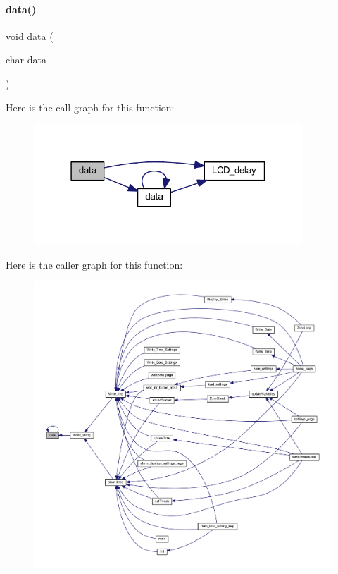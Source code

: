 \paragraph{data()}
{\footnotesize\ttfamily void data (\begin{DoxyParamCaption}\item[{char}]{data }\end{DoxyParamCaption})}

Here is the call graph for this function\+:
\nopagebreak
\begin{figure}[H]
\begin{center}
\leavevmode
\includegraphics[width=286pt]{a00035_a54955197a7b52d9a202b75527f68cc08_cgraph}
\end{center}
\end{figure}
Here is the caller graph for this function\+:
\nopagebreak
\begin{figure}[H]
\begin{center}
\leavevmode
\includegraphics[width=350pt]{a00035_a54955197a7b52d9a202b75527f68cc08_icgraph}
\end{center}
\end{figure}
\mbox{\label{a00035_a08529d00f32f8441dc7669b1a1d3783c}} 
